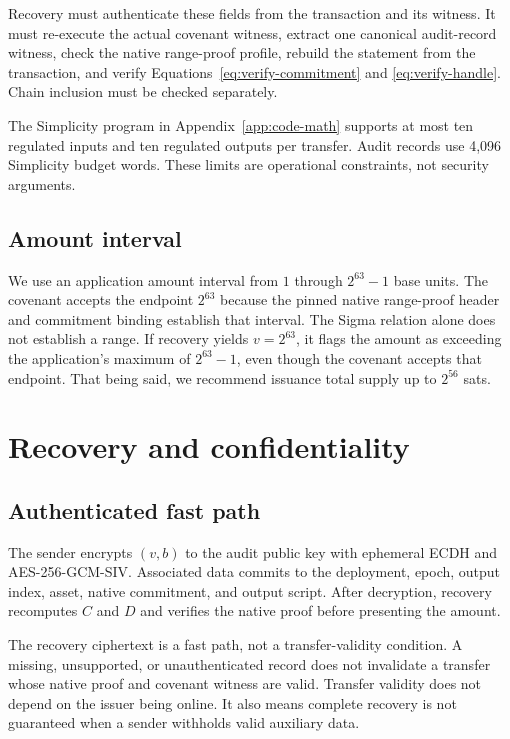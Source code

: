 \documentclass[11pt]{article}
\begin{document}
    Recovery must authenticate these fields from the transaction and its witness.
    It must re-execute the actual covenant witness, extract one canonical audit-record witness, check the native range-proof profile, rebuild the statement from the transaction, and verify Equations~\ref{eq:verify-commitment} and \ref{eq:verify-handle}.
    Chain inclusion must be checked separately.

    The Simplicity program in Appendix~\ref{app:code-math} supports at most ten regulated inputs and ten regulated outputs per transfer.
    Audit records use 4,096 Simplicity budget words.
    These limits are operational constraints, not security arguments.

    \subsection{Amount interval}

    We use an application amount interval from $1$ through $2^{63}-1$ base units.
    The covenant accepts the endpoint $2^{63}$ because the pinned native range-proof header and commitment binding establish that interval.
    The Sigma relation alone does not establish a range.
    If recovery yields $v=2^{63}$, it flags the amount as exceeding the application's maximum of $2^{63}-1$, even though the covenant accepts that endpoint.
    That being said, we recommend issuance total supply up to $2^{56}$ sats.

    \section{Recovery and confidentiality}
    \label{sec:recovery}

    \subsection{Authenticated fast path}

    The sender encrypts $(v,b)$ to the audit public key with ephemeral ECDH and AES-256-GCM-SIV.
    Associated data commits to the deployment, epoch, output index, asset, native commitment, and output script.
    After decryption, recovery recomputes $C$ and $D$ and verifies the native proof before presenting the amount.

    The recovery ciphertext is a fast path, not a transfer-validity condition.
    A missing, unsupported, or unauthenticated record does not invalidate a transfer whose native proof and covenant witness are valid.
    Transfer validity does not depend on the issuer being online.
    It also means complete recovery is not guaranteed when a sender withholds valid auxiliary data.
\end{document}
